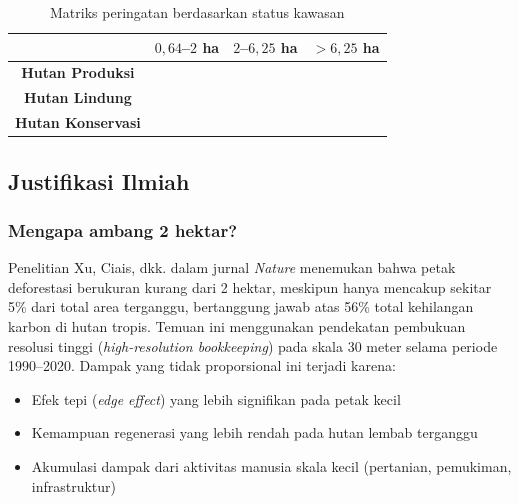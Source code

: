 \documentclass[12pt,a4paper]{article}
\begin{document}
\begin{table}[H]
\centering
\caption{Matriks peringatan berdasarkan status kawasan}
\label{tab:alert_matrix}
\small
\begin{tabular}{cccc}
\toprule
& \textbf{$0,64$--$2$ ha} & \textbf{$2$--$6,25$ ha} & \textbf{$>6,25$ ha} \\
\midrule
\textbf{Hutan Produksi} &
\color{greenalert}{$\bigtriangleup$ Waspada} &
\color{yellowalert}{$\blacktriangle$ Siaga} &
\color{redalert}{$\blacktriangle$ Kritis} \\
\textbf{Hutan Lindung} &
\color{yellowalert}{$\blacktriangle$ Siaga} &
\color{redalert}{$\blacktriangle$ Kritis} &
\color{redalert}{$\blacktriangle$ Kritis} \\
\textbf{Hutan Konservasi} &
\color{redalert}{$\blacktriangle$ Kritis} &
\color{redalert}{$\blacktriangle$ Kritis} &
\color{redalert}{$\blacktriangle$ Kritis} \\
\bottomrule
\end{tabular}
\end{table}

\subsection{Justifikasi Ilmiah}

\subsubsection{Mengapa ambang 2 hektar?}

Penelitian Xu, Ciais, dkk. \cite{xu2026nature} dalam jurnal \textit{Nature}
menemukan bahwa petak deforestasi berukuran kurang dari 2 hektar, meskipun
hanya mencakup sekitar 5\% dari total area terganggu, bertanggung jawab atas
56\% total kehilangan karbon di hutan tropis. Temuan ini menggunakan pendekatan
pembukuan resolusi tinggi (\textit{high-resolution bookkeeping}) pada skala
30 meter selama periode 1990--2020. Dampak yang tidak proporsional ini terjadi
karena:

\begin{itemize}[nosep]
    \item Efek tepi (\textit{edge effect}) yang lebih signifikan pada petak kecil
    \item Kemampuan regenerasi yang lebih rendah pada hutan lembab terganggu
    \item Akumulasi dampak dari aktivitas manusia skala kecil (pertanian,
          pemukiman, infrastruktur)
\end{itemize}
\end{document}

